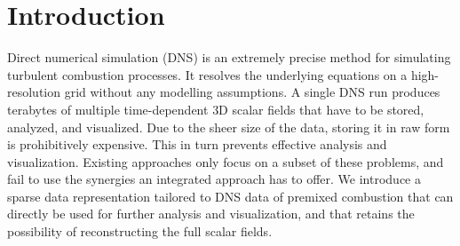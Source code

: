 
\section{Introduction}
\label{sec:intro}


Direct numerical simulation (\acs{DNS})  is an extremely precise
method for simulating turbulent combustion processes. It resolves the underlying
equations on a high-resolution grid without any modelling assumptions. A single
\ac{DNS} run produces terabytes of multiple time-dependent \ac{3D} scalar fields
that have to be stored, analyzed, and visualized. Due to the sheer size of the
data, storing it in raw form is prohibitively expensive. This in turn prevents
effective analysis and visualization. Existing approaches only focus on a subset
of these problems, and fail to use the synergies an integrated approach has to
offer. We introduce a sparse data representation tailored to \ac{DNS} data of
premixed combustion that can directly be used for further analysis and
visualization, and that retains the possibility of reconstructing the full
scalar fields.

%

